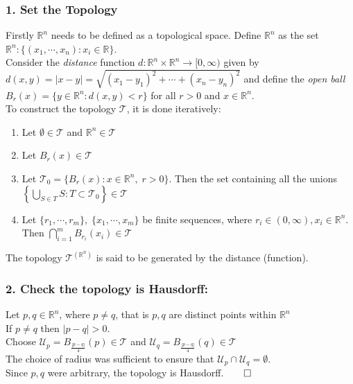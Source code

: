 \documentclass[11pt]{report}
\theoremstyle{thm}
\begin{document}
\subsubsection{1. Set the Topology}
Firstly $\mathbb{R}^n$ needs to be defined as a topological space. Define 
$\mathbb{R}^n$ as the set $\mathbb{R}^n: \{(x_1, \cdots, x_n): x_i \in 
\mathbb{R}\}$.\\[1em]
Consider the \textit{distance} function $d: \mathbb{R}^n \times \mathbb{R}^n 
\rightarrow [0,\infty)$ given by 
$d(x,y)=|x-y|=\sqrt{{(x_1-y_1)}^2+\cdots+{(x_n-y_n)}^2}$ and define the 
\textit{open ball} $B_r(x)=\{y\in \mathbb{R}^n: d(x,y)<r\}$ for all $r>0$ and 
$x\in \mathbb{R}^n$.\\[1em]
To construct the topology $\mathcal{T}$, it is done iteratively:
\begin{enumerate}
	\item Let $\emptyset \in \mathcal{T}$ and $\mathbb{R}^n \in \mathcal{T}$
	\item Let ${B_r(x)}\in \mathcal{T}$
	\item Let ${\mathcal{T}_0 =\{B_r(x): x\in \mathbb{R}^n,\; r > 0\}}$. Then the set containing all the unions $\left\{\bigcup\limits_{S\in T}{S} : T\subset \mathcal{T}_0 \right\} \in \mathcal{T}$
	\item Let $\{r_1, \cdots, r_m \},\; \{x_1, \cdots, x_m\}$ be finite sequences, where $r_i \in (0,\infty), x_i \in \mathbb{R}^n$.\\[0.5em]
	Then  $\bigcap\limits_{i=1}^{m}{B_{r_i}(x_i)} \in \mathcal{T}$
\end{enumerate}
The topology $\mathcal{T}^{(\mathbb{R}^n)}$ is said to be generated by the 
distance (function).
\subsubsection{2. Check the topology is Hausdorff:}
Let $p,q\in \mathbb{R}^n$, where $p\ne q$, that is $p,q$ are distinct points 
within $\mathbb{R}^n$\\[1em]
If $p\ne q$ then $|p-q|>0$.\\[1em]
Choose $\mathcal{U}_p = B_{\frac{|p-q|}{4}}(p)\in \mathcal{T}$ and $\mathcal{U}_q = B_{\frac{|p-q|}{4}}(q)\in \mathcal{T}$\\[1em]
The choice of radius was sufficient to ensure that $\mathcal{U}_p \cap 
\mathcal{U}_q = \emptyset$.\\[1em]
Since $p,q$ were arbitrary, the topology is Hausdorff.$\qed$
\newpage\noindent
\end{document}
